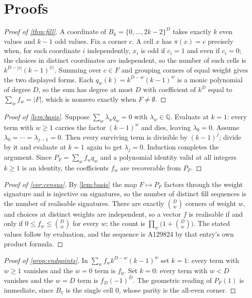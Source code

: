 \documentclass[11pt]{amsart}
\theoremstyle{definition}
\theoremstyle{remark}
\begin{document}
\section{Proofs}
\label{sec:proofs}

\begin{proof}[Proof of \cref{thm:fill}]
A coordinate of $B_{k} = \{0,\dots,2k-2\}^{D}$ takes exactly $k$ even values and $k-1$ odd values. Fix a corner $c$. A cell $x$ has $\pi(x) = c$ precisely when, for each coordinate $i$ independently, $x_{i}$ is odd if $c_{i}=1$ and even if $c_{i}=0$; the choices in distinct coordinates are independent, so the number of such cells is $k^{D-|c|}(k-1)^{|c|}$. Summing over $c \in F$ and grouping corners of equal weight gives the two displayed forms. Each $q_{w}(k) = k^{D-w}(k-1)^{w}$ is a monic polynomial of degree $D$, so the sum has degree at most $D$ with coefficient of $k^{D}$ equal to $\sum_{w}f_{w} = |F|$, which is nonzero exactly when $F \neq \emptyset$.
\end{proof}

\begin{proof}[Proof of \cref{lem:basis}]
Suppose $\sum_{w}\lambda_{w}q_{w} = 0$ with $\lambda_{w}\in\mathbb{Q}$. Evaluate at $k=1$: every term with $w \ge 1$ carries the factor $(k-1)^{w}$ and dies, leaving $\lambda_{0}=0$. Assume $\lambda_{0}=\cdots=\lambda_{j-1}=0$. Then every surviving term is divisible by $(k-1)^{j}$; divide by it and evaluate at $k=1$ again to get $\lambda_{j}=0$. Induction completes the argument. Since $P_{F}=\sum_{w}f_{w}q_{w}$ and a polynomial identity valid at all integers $k \ge 1$ is an identity, the coefficients $f_{w}$ are recoverable from $P_{F}$.
\end{proof}

\begin{proof}[Proof of \cref{cor:census}]
By \cref{lem:basis} the map $F \mapsto P_{F}$ factors through the weight signature and is injective on signatures, so the number of distinct fill sequences is the number of realisable signatures. There are exactly $\binom{D}{w}$ corners of weight $w$, and choices at distinct weights are independent, so a vector $f$ is realisable if and only if $0 \le f_{w} \le \binom{D}{w}$ for every $w$; the count is $\prod_{w}\bigl(1+\binom{D}{w}\bigr)$. The stated values follow by evaluation, and the sequence is A129824 by that entry's own product formula.
\end{proof}

\begin{proof}[Proof of \cref{prop:endpoints}]
In $\sum_{w}f_{w}k^{D-w}(k-1)^{w}$ set $k=1$: every term with $w \ge 1$ vanishes and the $w=0$ term is $f_{0}$. Set $k=0$: every term with $w < D$ vanishes and the $w=D$ term is $f_{D}(-1)^{D}$. The geometric reading of $P_{F}(1)$ is immediate, since $B_{1}$ is the single cell $0$, whose parity is the all-even corner.
\end{proof}
\end{document}
